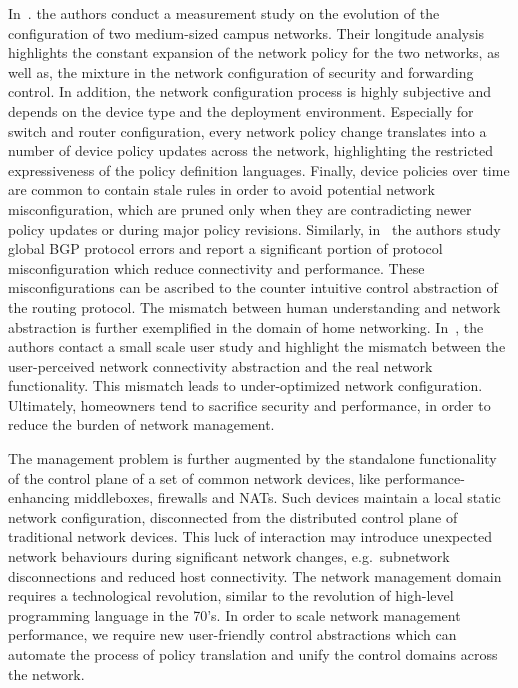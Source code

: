 
In~\cite{Kim11}. the authors conduct a measurement study on the evolution of the
configuration of two medium-sized campus networks. Their longitude analysis
highlights the constant expansion of the network policy for the two networks, as
well as, the mixture in the network configuration of security and forwarding
control.  In addition, the network configuration process is highly subjective
and depends on the device type and the deployment environment.  Especially for
switch and router configuration, every network policy change translates into a
number of device policy updates across the network, highlighting the restricted
expressiveness of the policy definition languages.  Finally, device policies
over time are common to contain stale rules in order to avoid potential network
misconfiguration, which are pruned only when they are contradicting newer policy
updates or during major policy revisions.  Similarly, in~\cite{Mahajan02} the
authors study global BGP protocol errors and report a significant portion of
protocol misconfiguration which reduce connectivity and performance. These
misconfigurations can be ascribed to the counter intuitive control abstraction
of the routing protocol.  The mismatch between human understanding and network
abstraction is further exemplified in the domain of home networking.
In~\cite{grinter05}, the authors contact a small scale user study and highlight
the mismatch between the user-perceived network connectivity abstraction and the
real network functionality. This mismatch leads to under-optimized network
configuration. Ultimately, homeowners tend to sacrifice security and
performance, in order to reduce the burden of network management. 

The management problem is further augmented by the standalone functionality of
the control plane of a set of common network devices, like performance-enhancing
middleboxes, firewalls and NATs. Such devices maintain a local static network
configuration, disconnected from the distributed control plane of traditional
network devices.  This luck of interaction may introduce unexpected network
behaviours during significant network changes, e.g.~subnetwork disconnections
and reduced host connectivity.  The network management domain requires a
technological revolution, similar to the revolution of high-level programming
language in the 70's.  In order to scale network management performance, we
require new user-friendly control abstractions which can automate the process of
policy translation and unify the control domains across the network. 

